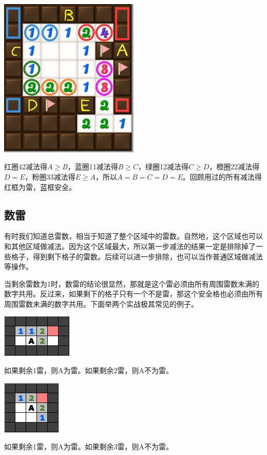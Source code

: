 \vspace{5mm}
\begin{center}
    \includegraphics[width=0.5\textwidth]{trick/环7.png}
\end{center}
红圈42减法得$A\ge B$，蓝圈11减法得$B\ge C$，绿圈12减法得$C\ge D$，橙圈22减法得$D=E$，粉圈33减法得$E\ge A$，所以$A=B=C=D=E$。回顾用过的所有减法得红框为雷，蓝框安全。

\subsection{数雷}
有时我们知道总雷数，相当于知道了整个区域中的雷数。自然地，这个区域也可以和其他区域做减法。因为这个区域最大，所以第一步减法的结果一定是排除掉了一些格子，得到剩下格子的雷数。后续可以进一步排除，也可以当作普通区域做减法等操作。

当剩余雷数为1时，数雷的结论很显然，那就是这个雷必须由所有周围雷数未满的数字共用。反过来，如果剩下的格子只有一个不是雷，那这个安全格也必须由所有周围雷数未满的数字共用。下面举两个实战极其常见的例子。

\vspace{5mm}
\begin{center}
    \includegraphics{trick/数雷1.png}
\end{center}
如果剩余1雷，则A为雷。如果剩余2雷，则A不为雷。

\vspace{5mm}
\begin{center}
    \includegraphics{trick/数雷2.png}
\end{center}
如果剩余1雷，则A为雷。如果剩余3雷，则A不为雷。